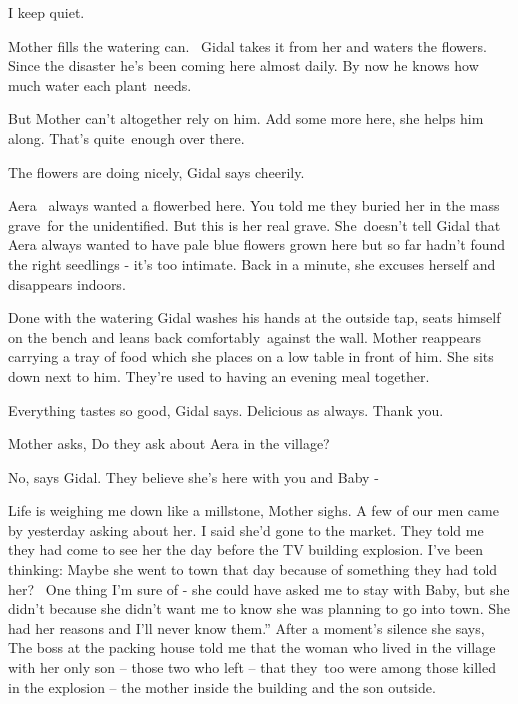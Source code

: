 \documentclass[12pt]{book}
\begin{document}
{\textquotedbl}I keep quiet.{\textquotedbl}

Mother fills the watering can. ~Gidal takes it from her and waters the flowers. Since the disaster he's been coming here
almost daily. By now he knows how much water each plant~needs.

But Mother can't altogether rely on him. {\textquotedbl}Add some more here,{\textquotedbl} she helps him along.
{\textquotedbl}That's quite~enough over there.{\textquotedbl}

{\textquotedbl}The flowers are doing nicely,{\textquotedbl} Gidal says cheerily.

{\textquotedbl}Aera~ always wanted a flowerbed here. You told me they buried her in the mass grave~for the unidentified.
But this is her real grave.{\textquotedbl} She~doesn't tell Gidal that Aera always wanted to have pale blue flowers
grown here but so far hadn't found the right seedlings - it's too intimate. {\textquotedbl}Back in a
minute,{\textquotedbl} she excuses herself and disappears indoors.

Done with the watering Gidal washes his hands at the outside tap, seats himself on the bench and leans back
comfortably~against the wall. Mother reappears carrying a tray of food which she places on a low table in front of him.
She sits down next to him. They're used to having an evening meal together.

{\textquotedbl}Everything tastes so good,{\textquotedbl} Gidal says. {\textquotedbl}Delicious as always. Thank
you.{\textquotedbl}

Mother asks, {\textquotedbl}Do they ask about Aera in the village?{\textquotedbl}

{\textquotedbl}No,{\textquotedbl} says Gidal. {\textquotedbl}They believe she's here with you and Baby -{\textquotedbl}

{\textquotedbl}Life is weighing me down{ }like a millstone,{\textquotedbl}
Mother sighs. {\textquotedbl}A few of our men came by yesterday asking about her. I said she'd gone to the market. They
told me they had come to see her the day before the TV building explosion. I've been thinking: Maybe she went to town
that day because of something they had told her? ~One thing I'm sure of - she could have asked me to stay with Baby,
but she didn't because she didn't want me to know she was planning to go into town. She had her reasons and I'll never
know them.'' After a moment's silence she says, {\textquotedbl}The boss at the packing house told me that the woman who
lived in the village with her only son -- those two who left -- that they~too were among those killed in the explosion
-- the mother inside the building and the son outside.{\textquotedbl}
\end{document}
